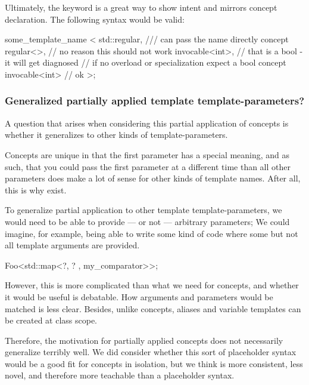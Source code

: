 \documentclass{wg21}
\begin{document}
Ultimately, the  keyword is a great way to show intent and mirrors concept declaration. The following syntax would be valid:

\begin{colorblock}
some_template_name <
    std::regular,  /// can pass the name directly
    concept regular<>, // no reason this should not work
    invocable<int>, // that is a bool - it will get diagnosed
                    // if no overload or specialization expect a bool
    concept invocable<int> // ok
>;
\end{colorblock}

\subsubsection{Generalized partially applied template template-parameters?}

A question that arises when considering this partial application of concepts is whether it generalizes to other kinds of template-parameters.

Concepts are unique in that the first parameter has a special meaning, and as such, that you could pass the first parameter at a different time than all other parameters does make a lot of sense for other kinds of template names.
After all, this is why  exist.

To generalize partial application
to other template template-parameters, we would need to be able to provide --- or not --- arbitrary parameters;
We could imagine, for example, being able to write some kind of code where some but not all template arguments are provided.

\begin{colorblock}
Foo<std::map<?, ? , my_comparator>>;
\end{colorblock}

However, this is more complicated than what we need for concepts, and whether it would be useful is debatable.
How arguments and parameters would be matched is less clear.
Besides, unlike concepts, aliases and variable templates can be created at class scope.

Therefore, the motivation for partially applied concepts does not necessarily generalize terribly well.
We did consider whether this sort of placeholder syntax would be a good fit for concepts in isolation, but
we think  is more consistent, less novel, and
therefore more teachable than a placeholder syntax.
\end{document}
